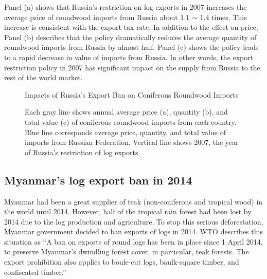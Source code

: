 \documentclass[a4paper,12pt]{article}
\begin{document}
Panel (a) shows that Russia's restriction on log exports in 2007 increases the average price of roundwood imports from Russia about 1.1 $\sim$ 1.4 times. This increase is consistent with the export tax rate. In addition to the effect on price, Panel (b) describes that the policy dramatically reduces the average quantity of roundwood imports from Russia by almost half. Panel (c) shows the policy leads to a rapid decrease in value of imports from Russia. In other words, the export restriction policy in 2007 has significant impact on the supply from Russia to the rest of the world market. 

\begin{figure}[H]
    \centering
    \caption{Impacts of Russia's Export Ban on Coniferous Roundwood Imports}
    \caption*{\small{Each gray line shows annual average price (a), quantity (b), and total value (c) of coniferous roundwood imports from each country. Blue line corresponds average price, quantity, and total value of imports from Russian Federation. Vertical line shows 2007, the year of Russia's restriction of log exports.}}
    \label{fig:shock_russia}
\end{figure}

\subsection{Myanmar's log export ban in 2014}
Myanmar had been a great supplier of teak (non-coniferous and tropical wood) in the world until 2014. However, half of the tropical rain forest had been lost by 2014 due to the log production and agriculture. To stop this serious deforestation, Myanmar government decided to ban exports of logs in 2014. WTO describes this situation as ``A ban on exports of round logs has been in place since 1 April 2014, to preserve Myanmar's dwindling forest cover, in particular, teak forests. The export prohibition also applies to boule-cut logs, baulk-square timber, and confiscated timber.'' \\
\end{document}
